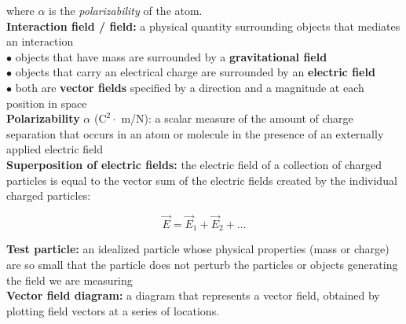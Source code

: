         where $\alpha$ is the \textit{polarizability} of the atom. \\
        \textbf{Interaction field / field:} a physical quantity surrounding objects that mediates an interaction \\
        $\bullet$ objects that have mass are surrounded by a \textbf{gravitational field} \\
        $\bullet$ objects that carry an electrical charge are surrounded by an \textbf{electric field} \\
        $\bullet$ both are \textbf{vector fields} specified by a direction and a magnitude at each position in space \\
        \textbf{Polarizability} $\alpha$ ($\text{C}^2 \cdot $ m/N): a scalar measure of the amount of charge separation that occurs in an atom or molecule in the presence of an externally applied electric field \\
        \textbf{Superposition of electric fields:} the electric field of a collection of charged particles is equal to the vector sum of the electric fields created by the individual charged particles:

        \[
            \vec{E} = \vec{E}_1 + \vec{E}_2 + \dots
        \]

        \textbf{Test particle:} an idealized particle whose physical properties (mass or charge) are so small that the particle does not perturb the particles or objects generating the field we are measuring \\
        \textbf{Vector field diagram:} a diagram that represents a vector field, obtained by plotting field vectors at a series of locations.